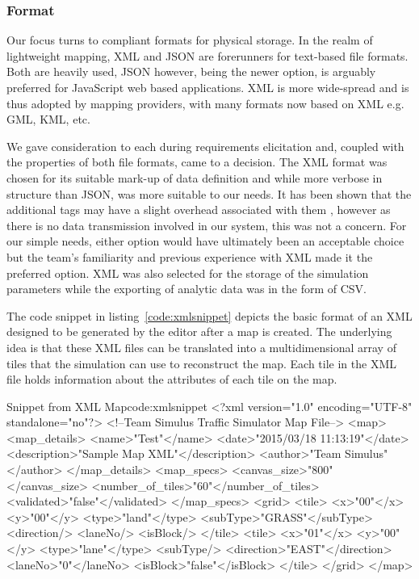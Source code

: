 \subsubsection{Format}
Our focus turns to compliant formats for physical storage.  In the realm of lightweight mapping, XML and JSON are forerunners for text-based file formats.  Both are heavily used, JSON however, being the newer option, is arguably preferred for JavaScript web based applications.  XML is more wide-spread and is thus adopted by mapping providers, with many formats now based on XML e.g. GML, KML, etc.
 
We gave consideration to each during requirements elicitation and, coupled with the properties of both file formats, came to a decision.  The XML format was chosen for its suitable mark-up of data definition and while more verbose in structure than JSON, was more suitable to our needs.  It has been shown that the additional tags may have a slight overhead associated with them \cite{codeproject2013}, however as there is no data transmission involved in our system, this was not a concern.  For our simple needs, either option would have ultimately been an acceptable choice but the team's familiarity and previous experience with XML made it the preferred option.  XML was also selected for the storage of the simulation parameters while the exporting of analytic data was in the form of CSV. 

The code snippet in listing~\ref{code:xmlsnippet} depicts the basic format of an XML designed to be generated by the editor after a map is created. The underlying idea is that these XML files can be translated into a multidimensional array of tiles that the simulation can use to reconstruct the map. Each tile in the XML file holds information about the attributes of each tile on the map.

\begin{xml-code}{Snippet from XML Map}{code:xmlsnippet}
<?xml version="1.0" encoding="UTF-8" standalone="no"?>
<!--Team Simulus Traffic Simulator Map File-->
<map>
  <map_details>
    <name>"Test"</name>
    <date>"2015/03/18 11:13:19"</date>
    <description>"Sample Map XML"</description>
    <author>"Team Simulus"</author>
  </map_details>
  <map_specs>
    <canvas_size>"800"</canvas_size>
    <number_of_tiles>"60"</number_of_tiles>
    <validated>"false"</validated>
  </map_specs>
  <grid>
    <tile>
      <x>"00"</x>
      <y>"00"</y>
      <type>"land"</type>
      <subType>"GRASS"</subType>
      <direction/>
      <laneNo/>
      <isBlock/>
    </tile>
    <tile>
      <x>"01"</x>
      <y>"00"</y>
      <type>"lane"</type>
      <subType/>
      <direction>"EAST"</direction>
      <laneNo>"0"</laneNo>
      <isBlock>"false"</isBlock>
    </tile>
  </grid>
</map>
\end{xml-code}


